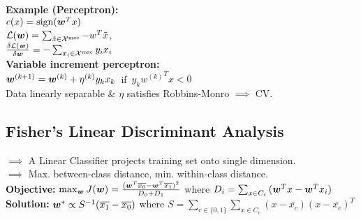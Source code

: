 
\textbf{Example (Perceptron):}\\
$c(x) = \mathrm{sign}({\bm{w}}^Tx)$\\
$\mathcal{L}({\bm{w}})=\sum_{\tilde{x}\in\mathcal{X}^\text{msc}}-w^T\tilde{x}$,\\
$\frac{\delta\mathcal{L}({\bm{w}})}{\delta{\bm{w}}} = -\sum_{x_i\in\mathcal{X}^\text{msc}}y_ix_i$\\
\textbf{Variable increment perceptron:}\\
\mbox{\hspace{-0.5em}${\bm{w}}^{(k+1)}={\bm{w}}^{(k)}+\eta^{(k)}y_kx_k $ if $y_k{w^{(k)}}^Tx < 0$}\\
Data linearly separable \& $\eta$ satisfies Robbins-Monro $\implies$ CV. 
\subsection*{Fisher's Linear Discriminant Analysis}
$\implies$ A Linear Classifier projects training set onto
single dimension.\\
$\implies$ Max. between-class distance, min. within-class distance.\\
\textbf{Objective:} \mbox{$\max_{\bm{w}} J({\bm{w}}) = \frac{({\bm{w}}^T\overline{x_0} - {\bm{w}}^T\overline{x_1})^2}{D_0+D_1}$}
where $D_i = \sum_{x\in C_i}{({\bm{w}}^Tx - {\bm{w}}^Tx_i)}$\\
\textbf{Solution:}
${\bm{w}}^* \propto S^{-1}(\overline{x_1}-\overline{x_0})$ where $S = \sum_{c\in\{0,1\}}\sum_{x\in C_c}(x-\bar{x_c})(x-\bar{x_c})^T$
